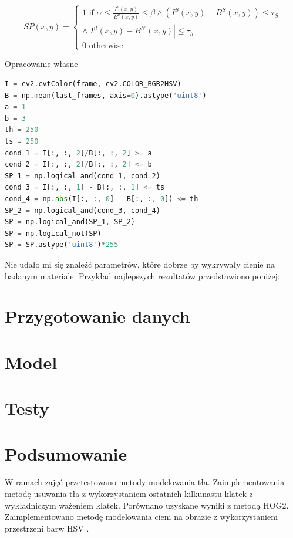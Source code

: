 \documentclass[wi]{zut}
\begin{document}
\begin{equation}
    S P(x, y)=\left\{\begin{array}{l}
1 \text { if } \alpha \leq \frac{I^{v}(x, y)}{B^{v}(x, y)} \leq \beta \wedge\left(I^{S}(x, y)-B^{S}(x, y)\right) \leq \tau_{S} \\
\wedge\left|I^{i l}(x, y)-B^{h \prime}(x, y)\right| \leq \tau_{h} \\
0 \text { otherwise }
\end{array}\right.
\end{equation}

{Opracowanie własne}{\label{kod:przyklad}}
\begin{lstlisting}[language=Python]
I = cv2.cvtColor(frame, cv2.COLOR_BGR2HSV)
B = np.mean(last_frames, axis=0).astype('uint8')
a = 1
b = 3
th = 250
ts = 250
cond_1 = I[:, :, 2]/B[:, :, 2] >= a
cond_2 = I[:, :, 2]/B[:, :, 2] <= b
SP_1 = np.logical_and(cond_1, cond_2)
cond_3 = I[:, :, 1] - B[:, :, 1] <= ts
cond_4 = np.abs(I[:, :, 0] - B[:, :, 0]) <= th
SP_2 = np.logical_and(cond_3, cond_4)
SP = np.logical_and(SP_1, SP_2)
SP = np.logical_not(SP)
SP = SP.astype('uint8')*255
\end{lstlisting}

Nie udało mi się znaleźć parametrów, które dobrze by wykrywały cienie na badanym materiale. Przykład najlepszych rezultatów przedstawiono poniżej:

\section{Przygotowanie danych}

\section{Model}

\section{Testy}

\section{Podsumowanie}

W ramach zajęć przetestowano metody modelowania tła. Zaimplementowania metodę usuwania tła z wykorzystaniem ostatnich kilkunastu klatek z wykładniczym ważeniem klatek. Porównano uzyskane wyniki z metodą HOG2. Zaimplementowano metodę modelowania cieni na obrazie z wykorzystaniem przestrzeni barw HSV \cite{granovetter1978threshold}.
\end{document}
